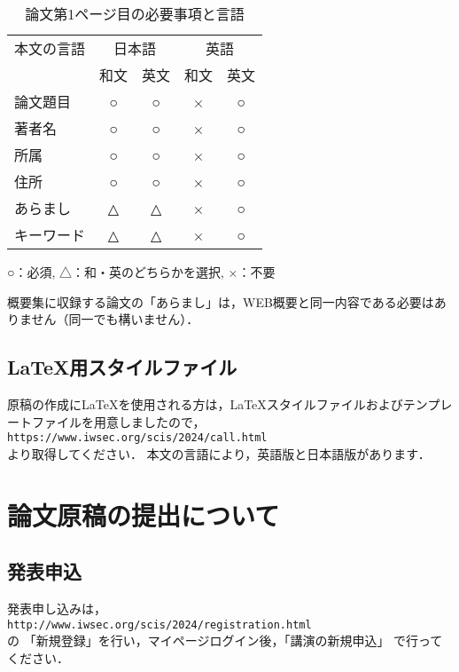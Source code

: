 \documentclass{jarticle} %
\begin{document}
\begin{small}
\begin{table}
  \centering
    \caption{論文第1ページ目の必要事項と言語}
    \begin{tabular}{|lcccc|} \hline
      本文の言語 & \multicolumn{2}{c}{日本語} & \multicolumn{2}{c|}{英語} \\
                 & 和文 & 英文 & 和文 & 英文 \\ \hline
      論文題目   & ○   & ○   & ×   & ○ \\
      著者名     & ○   & ○   & ×   & ○ \\
      所属       & ○   & ○   & ×   & ○ \\
      住所       & ○   & ○   & ×   & ○ \\
      あらまし   & △   & △   & ×   & ○ \\
      キーワード & △   & △   & ×   & ○ \\ \hline
    \end{tabular}
    \label{tab:const}

    ○：必須, △：和・英のどちらかを選択, ×：不要
\end{table}
\end{small}

概要集に収録する論文の「あらまし」は，WEB概要と同一内容である必要はありません（同一でも構いません）．


\subsection{\LaTeX 用スタイルファイル}

原稿の作成に\LaTeX を使用される方は，\LaTeX スタイルファイルおよびテンプレートファイルを用意しましたので，\\
\texttt{https://www.iwsec.org/scis/2024/call.html} \\
より取得してください．
本文の言語により，英語版と日本語版があります．



\section{論文原稿の提出について}

\subsection{発表申込}

発表申し込みは，\\
\texttt{http://www.iwsec.org/scis/2024/registration.html}\\ の
「新規登録」を行い，マイページログイン後，「講演の新規申込」
で行ってください．
\end{document}

